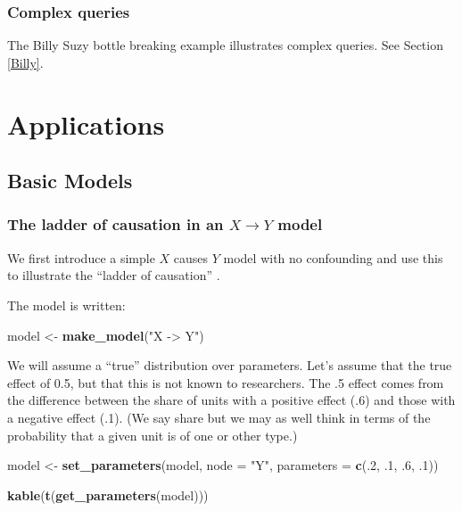 \documentclass[
  12pt,
]{book}
\newenvironment{Shaded}{\begin{snugshade}}{\end{snugshade}}
\newcommand{\DataTypeTok}[1]{\textcolor[rgb]{0.13,0.29,0.53}{#1}}
\newcommand{\DecValTok}[1]{\textcolor[rgb]{0.00,0.00,0.81}{#1}}
\newcommand{\FloatTok}[1]{\textcolor[rgb]{0.00,0.00,0.81}{#1}}
\newcommand{\KeywordTok}[1]{\textcolor[rgb]{0.13,0.29,0.53}{\textbf{#1}}}
\newcommand{\NormalTok}[1]{#1}
\newcommand{\StringTok}[1]{\textcolor[rgb]{0.31,0.60,0.02}{#1}}
\begin{document}
\hypertarget{complex-queries}{%
\section{Complex queries}\label{complex-queries}}

The Billy Suzy bottle breaking example illustrates complex queries. See Section \ref{Billy}.

\hypertarget{part-applications}{%
\part{Applications}\label{part-applications}}

\hypertarget{applications}{%
\chapter{Basic Models}\label{applications}}

\hypertarget{the-ladder-of-causation-in-an-x-rightarrow-y-model}{%
\section{\texorpdfstring{The ladder of causation in an \(X \rightarrow Y\) model}{The ladder of causation in an X \textbackslash rightarrow Y model}}\label{the-ladder-of-causation-in-an-x-rightarrow-y-model}}

We first introduce a simple \(X\) causes \(Y\) model with no confounding and use this to illustrate the ``ladder of causation'' \citep{pearl2018book}.

The model is written:

\begin{Shaded}
\begin{Highlighting}[]
\NormalTok{model <-}\StringTok{ }\KeywordTok{make_model}\NormalTok{(}\StringTok{"X -> Y"}\NormalTok{)}
\end{Highlighting}
\end{Shaded}

We will assume a ``true'' distribution over parameters. Let's assume that the true effect of 0.5, but that this is not known to researchers. The .5 effect comes from the difference between the share of units with a positive effect (.6) and those with a negative effect (.1). (We say share but we may as well think in terms of the probability that a given unit is of one or other type.)

\begin{Shaded}
\begin{Highlighting}[]
\NormalTok{model <-}\StringTok{ }
\StringTok{  }\KeywordTok{set_parameters}\NormalTok{(model, }\DataTypeTok{node =} \StringTok{"Y"}\NormalTok{, }\DataTypeTok{parameters =} \KeywordTok{c}\NormalTok{(.}\DecValTok{2}\NormalTok{, }\FloatTok{.1}\NormalTok{, }\FloatTok{.6}\NormalTok{, }\FloatTok{.1}\NormalTok{))}

\KeywordTok{kable}\NormalTok{(}\KeywordTok{t}\NormalTok{(}\KeywordTok{get_parameters}\NormalTok{(model)))}
\end{Highlighting}
\end{Shaded}
\end{document}
